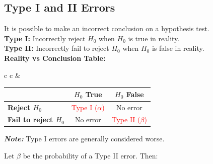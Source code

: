 \subsection*{Type I and II Errors}

It is possible to make an incorrect conclusion on a hypothesis test. \\

\textbf{Type I:} Incorrectly reject $H_0$ when $H_0$ is true in reality. \\
\textbf{Type II:} Incorrectly fail to reject $H_0$ when $H_0$ is false in reality. \\


\noindent \textbf{Reality vs Conclusion Table:}
\vspace{1em}
\begin{center}
\small
\renewcommand{\arraystretch}{1.8}
\setlength{\tabcolsep}{1.5em}


\vspace{0.5em}

\begin{tabular}{c c}
\hspace*{2em} &
\begin{tabular}{|l|c|c|}
\hline
& $H_0$ True & $H_0$ False \\
\hline
\textbf{Reject $H_0$} & \textcolor{red}{Type I ($\alpha$)} & \textcolor{green!50!black}{No error \checkmark} \\
\hline
\textbf{Fail to reject $H_0$} & \textcolor{green!50!black}{No error \checkmark} & \textcolor{red}{Type II ($\beta$)} \\
\hline
\end{tabular}
\end{tabular}
\end{center}



\vspace{1em}
\textbf{\textit{Note:}} Type I errors are generally considered worse.

\vspace{0.5em}
\noindent Let $\beta$ be the probability of a Type II error. Then:


